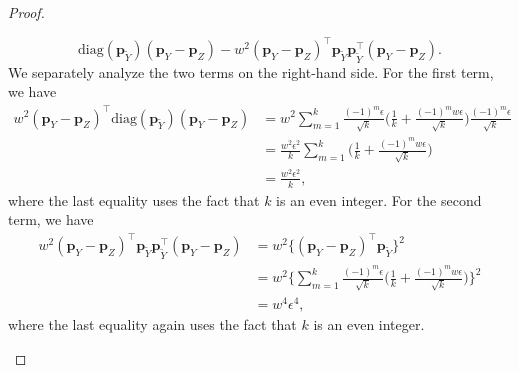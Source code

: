 \documentclass[twoside,11pt]{article}
\newcommand{\rvTwo}{Y}
\newcommand{\rvThree}{Z}
\newcommand{\alphabetSize}{k} %
\newcommand{\vectorIndex}{m}
\newcommand{\probVec}{\mathbf{p}} %
\begin{document}
\begin{appendix}
\begin{proof}
\begin{itemize}
\begin{equation*}
				\mathrm{diag}(\probVec_{\tilde{\rvTwo}})
				(\probVec_\rvTwo - \probVec_\rvThree)
				-
				w^2
				(\probVec_\rvTwo - \probVec_\rvThree)^\top 
				\probVec_{\tilde{\rvTwo}}
				\probVec_{\tilde{\rvTwo}}^\top
				(\probVec_\rvTwo - \probVec_\rvThree).  
			\end{equation*}
			We separately analyze the two terms on the right-hand side. For the first term, we have
			\begin{align*}
				w^2
				(\probVec_\rvTwo - \probVec_\rvThree)^\top 
				\mathrm{diag}(\probVec_{\tilde{\rvTwo}})
				(\probVec_\rvTwo - \probVec_\rvThree)
				&=
				w^2
				\sum_{\vectorIndex=1}^\alphabetSize
				\frac{
					(-1)^\vectorIndex \epsilon
				}{
					\sqrt{\alphabetSize}
				}
				\biggl(
				\frac{1}{\alphabetSize}
				+
				\frac{
					(-1)^\vectorIndex 
					w\epsilon
				}{
					\sqrt{\alphabetSize}
				}
				\biggr)
				\frac{
					(-1)^\vectorIndex \epsilon
				}{
					\sqrt{\alphabetSize}
				}
				\\&=%
				\frac{w^2\epsilon^2}{
					\alphabetSize
				}
				\sum_{\vectorIndex=1}^\alphabetSize
				\biggl(
				\frac{1}{\alphabetSize}
				+
				\frac{
					(-1)^\vectorIndex w\epsilon
				}{
					\sqrt{\alphabetSize}
				}
				\biggr)
				\\&=%
				\frac{w^2\epsilon^2}{
					\alphabetSize
				},
			\end{align*}
			where the last equality uses the fact that $\alphabetSize$ is an even integer. For the second term, we have
			\begin{align*}
				w^2
				(\probVec_\rvTwo - \probVec_\rvThree)^\top 
				\probVec_{\tilde{\rvTwo}}
				\probVec_{\tilde{\rvTwo}}^\top
				(\probVec_\rvTwo - \probVec_\rvThree)
				&=
				w^2
				\bigl\{
				(\probVec_\rvTwo - \probVec_\rvThree)^\top 
				\probVec_{\tilde{\rvTwo}}
				\bigr\}^2
				\\&=
				w^2
				\biggl\{%
				\sum_{\vectorIndex=1}^\alphabetSize
				\frac{
					(-1)^\vectorIndex \epsilon
				}{
					\sqrt{\alphabetSize}
				}
				\biggl(
				\frac{1}{\alphabetSize}
				+
				\frac{
					(-1)^\vectorIndex w\epsilon
				}{
					\sqrt{\alphabetSize}
				}
				\biggr)
				\biggr\}^2%
				\\&=w^4 \epsilon^4,
			\end{align*}
			where  the last equality again uses the fact that $\alphabetSize$ is an even integer.

\end{itemize}
\end{proof}
\end{appendix}
\end{document}
